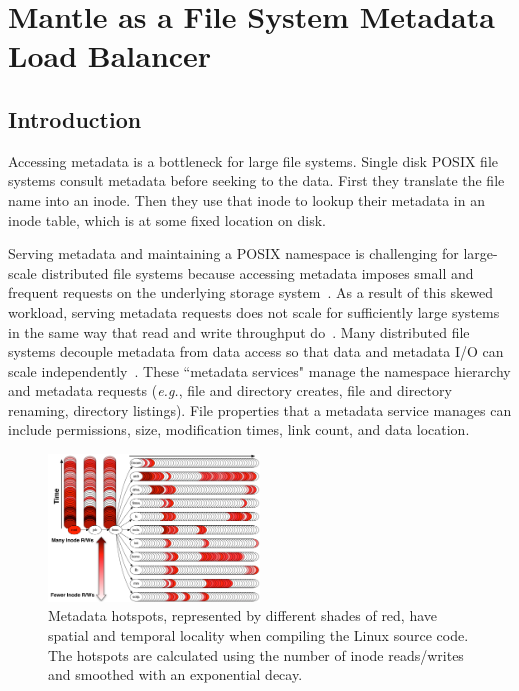 \chapter{Mantle as a File System Metadata Load Balancer}
\label{mantle}

\section{Introduction}								    %
\label{introduction}								    %


Accessing metadata is a bottleneck for large file systems. Single disk POSIX
file systems consult metadata before seeking to the data. First they translate
the file name into an inode. Then they use that inode to lookup their metadata
in an inode table, which is at some fixed location on disk. 

Serving metadata and maintaining a POSIX namespace is challenging for
large-scale distributed file systems because accessing metadata imposes small
and frequent requests on the underlying storage
system~\cite{roselli:atec2000-FS-workloads}. As a result of this skewed
workload, serving metadata requests does not scale for sufficiently large
systems in the same way that read and write throughput
do~\cite{abad:ucc2012-mimesis, alam:pdsw2011-metadata-scaling,
weil:osdi2006-ceph}. Many distributed file systems decouple metadata from data
access so that data and metadata I/O can scale
independently~\cite{alam:pdsw2011-metadata-scaling, ghemawat:sosp2003-gfs,
hildebrand:msst2005-pnfs,weil:osdi2006-ceph,welch:fast2008-panasas,xing:sc2009-skyfs}.
These ``metadata services" manage the namespace hierarchy and metadata requests
({\it e.g.}, file and directory creates, file and directory renaming, directory
listings). File properties that a metadata service manages can include
permissions, size, modification times, link count, and data location. 


\begin{figure}[tb]
	\centering	
	\includegraphics[width=0.5\textwidth]{./chapters/mantle/figures/workload-tar.png}
	\caption{Metadata hotspots, represented by different shades of red, have spatial and temporal locality when compiling the Linux source code. The hotspots are calculated using the number of inode reads/writes and smoothed with an exponential decay. \label{figure:workload-tar}}
\end{figure}

